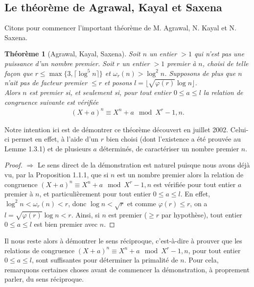 \documentclass[11pt]{article}
\newtheorem{theo}{Théorème}[subsection]
\begin{document}
\subsection{Le théorème de Agrawal, Kayal et Saxena}

Citons pour commencer l'important théorème de M. Agrawal, N. Kayal et N. Saxena.

\begin{theo}[Agrawal, Kayal, Saxena]
Soit $n$ un entier $>1$ qui n'est pas une puissance d'un nombre premier. Soit $r$ un entier $>1$ premier à $n$, choisi de telle façon que $r \leqslant \max \lbrace 3, \lceil \log^5 n \rceil \rbrace$ et $\omega_r(n) > \log^2 n$. Supposons de plus que $n$ n'ait pas de facteur premier $\leqslant r$ et posons $l=\lfloor \sqrt{\varphi(r)} \log n \rfloor$.\\
\noindent
Alors $n$ est premier si, et seulement si, pour tout entier $0 \leqslant a \leqslant l$ la relation de congruence suivante est vérifiée
\begin{align*}
(X+a)^n \equiv X^n + a \mod X^r-1,n.
\end{align*}
\end{theo}

Notre intention ici est de démontrer ce théorème découvert en juillet 2002. Celui-ci permet en effet, à l'aide d'un $r$ bien choisi (dont l'existence a été prouvée au Lemme 1.3.1) et de plusieurs $a$ déterminés, de caractériser un nombre premier $n$.

\begin{small}
\begin{proof}
$\Rightarrow$ Le sens direct de la démonstration est naturel puisque nous avons déjà vu, par la Proposition 1.1.1, que si $n$ est un nombre premier alors la relation de congruence $(X+a)^n \equiv X^n + a \mod X^r-1,n$ est vérifiée pour tout entier $a$ premier à $n$, et particulièrement pour tout entier $0 \leqslant a \leqslant l$. En effet, $\log^2 n < \omega_r(n) < r$, donc $\log n < \sqrt{r}$ et comme $\varphi(r) \leqslant r$, on a $l=\sqrt{\varphi(r)} \log n < r$. Ainsi, si $n$ est premier ($\geqslant r$ par hypothèse), tout entier $0 \leqslant a \leqslant l$ est bien premier avec $n$.
\end{proof}
\end{small}

Il nous reste alors à démontrer le sens réciproque, c'est-à-dire à prouver que les relations de congruence $(X+a)^n \equiv X^n + a \mod X^r-1,n$, pour tout entier $0 \leqslant a \leqslant l$, sont suffisantes pour déterminer la primalité de $n$. Pour cela, remarquons certaines choses avant de commencer la démonstration, à proprement parler, du sens réciproque.\\
\end{document}
